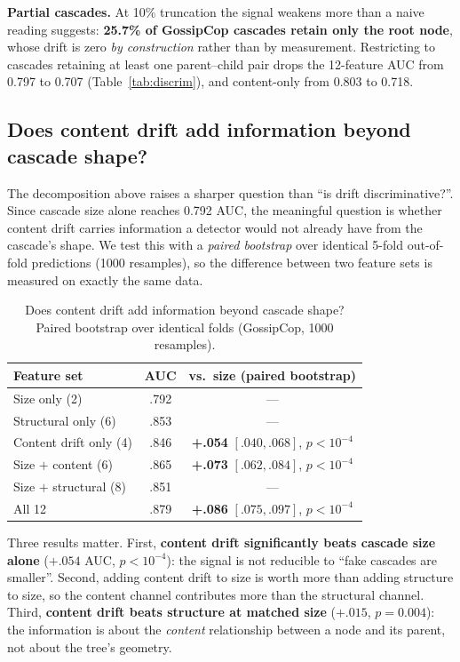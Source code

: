 \documentclass[10pt,twocolumn]{article}
\begin{document}
\textbf{Partial cascades.} At 10\% truncation the signal weakens more than a
naive reading suggests: \textbf{25.7\% of GossipCop cascades retain only the
root node}, whose drift is zero \emph{by construction} rather than by
measurement. Restricting to cascades retaining at least one parent--child pair
drops the 12-feature AUC from 0.797 to 0.707 (Table~\ref{tab:discrim}), and
content-only from 0.803 to 0.718.

\subsection{Does content drift add information beyond cascade shape?}
\label{sec:incremental}

The decomposition above raises a sharper question than ``is drift
discriminative?''. Since cascade size alone reaches 0.792 AUC, the meaningful
question is whether content drift carries information a detector would not
already have from the cascade's shape. We test this with a \emph{paired
bootstrap} over identical 5-fold out-of-fold predictions (1000 resamples), so
the difference between two feature sets is measured on exactly the same data.

\begin{table}[t]
  \centering
  \caption{Does content drift add information beyond cascade shape?
  Paired bootstrap over identical folds (GossipCop, 1000 resamples).}
  \label{tab:incremental}
  \footnotesize
  \setlength{\tabcolsep}{2pt}
  \begin{tabular}{lcc}
    \toprule
    Feature set & AUC & vs.\ size (paired bootstrap) \\
    \midrule
    Size only (2) & .792 & --- \\
    Structural only (6) & .853 & --- \\
    Content drift only (4) & .846 & \textbf{+.054} $[.040,.068]$, $p<10^{-4}$ \\
    Size $+$ content (6) & .865 & \textbf{+.073} $[.062,.084]$, $p<10^{-4}$ \\
    Size $+$ structural (8) & .851 & --- \\
    All 12 & .879 & \textbf{+.086} $[.075,.097]$, $p<10^{-4}$ \\
    \bottomrule
  \end{tabular}
\end{table}

Three results matter. First, \textbf{content drift significantly beats cascade
size alone} ($+.054$ AUC, $p<10^{-4}$): the signal is not reducible to ``fake
cascades are smaller''. Second, adding content drift to size is worth more
than adding structure to size, so the content channel contributes more than
the structural channel. Third, \textbf{content drift beats structure at
matched size} ($+.015$, $p=0.004$): the information is about the
\emph{content} relationship between a node and its parent, not about the
tree's geometry.
\end{document}
